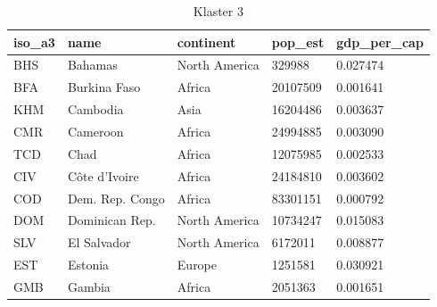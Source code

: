 \documentclass[11pt]{report}
\begin{document}
    \begin{table}[h!]
        \caption {Klaster 3} \label{tab:cl3}
        \begin{tabular}{lllll}
            \hline
            \multicolumn{1}{|l|}{iso\_a3} & \multicolumn{1}{l|}{name} & \multicolumn{1}{l|}{continent} & \multicolumn{1}{l|}{pop\_est} & \multicolumn{1}{l|}{gdp\_per\_cap} \\ \hline
            BHS                           & Bahamas                   & North America                  & 329988                        & 0.027474                           \\
            BFA                           & Burkina Faso              & Africa                         & 20107509                      & 0.001641                           \\
            KHM                           & Cambodia                  & Asia                           & 16204486                      & 0.003637                           \\
            CMR                           & Cameroon                  & Africa                         & 24994885                      & 0.003090                           \\
            TCD                           & Chad                      & Africa                         & 12075985                      & 0.002533                           \\
            CIV                           & Côte d'Ivoire             & Africa                         & 24184810                      & 0.003602                           \\
            COD                           & Dem. Rep. Congo           & Africa                         & 83301151                      & 0.000792                           \\
            DOM                           & Dominican Rep.            & North America                  & 10734247                      & 0.015083                           \\
            SLV                           & El Salvador               & North America                  & 6172011                       & 0.008877                           \\
            EST                           & Estonia                   & Europe                         & 1251581                       & 0.030921                           \\
            GMB                           & Gambia                    & Africa                         & 2051363                       & 0.001651                           \\

\end{tabular}
\end{table}
\end{document}
